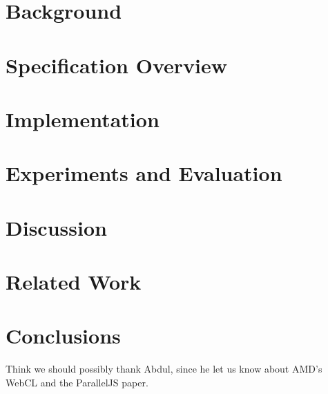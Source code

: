 \documentclass[10pt,reprint]{sigplanconf}
\begin{document}
\section{Background}
\label{background}


\section{Specification Overview}
\label{overview}


\section{Implementation}
\label{imp}


\section{Experiments and Evaluation}
\label{eval}


\section{Discussion}
\label{disc}


\section{Related Work}
\label{related}


\section{Conclusions}
\label{conc}





\acks

Think we should possibly thank Abdul, since he let us know about AMD's WebCL and
the ParallelJS paper.






%


\end{document}
